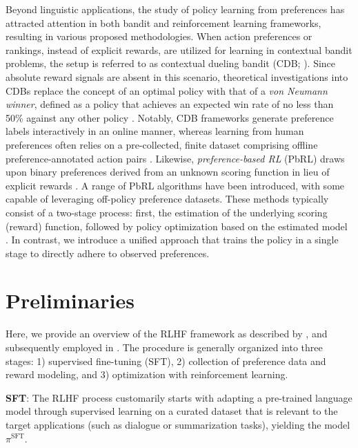 Beyond linguistic applications, the study of policy learning from preferences has attracted attention in both bandit and reinforcement learning frameworks, resulting in various proposed methodologies. When action preferences or rankings, instead of explicit rewards, are utilized for learning in contextual bandit problems, the setup is referred to as contextual dueling bandit (CDB; \cite{yue2012karmed,dudik2015contextual}). Since absolute reward signals are absent in this scenario, theoretical investigations into CDBs replace the concept of an optimal policy with that of a \textit{von Neumann winner}, defined as a policy that achieves an expected win rate of no less than 50\% against any other policy \citep{dudik2015contextual}. Notably, CDB frameworks generate preference labels interactively in an online manner, whereas learning from human preferences often relies on a pre-collected, finite dataset comprising offline preference-annotated action pairs \citep{yan2022human}. Likewise, \textit{preference-based RL} (PbRL) draws upon binary preferences derived from an unknown scoring function in lieu of explicit rewards \citep{BusaFekete2014,ruiz2023dueling}. A range of PbRL algorithms have been introduced, with some capable of leveraging off-policy preference datasets. These methods typically consist of a two-stage process: first, the estimation of the underlying scoring (reward) function, followed by policy optimization based on the estimated model \citep{jain2013learning,BusaFekete2014,christiano2017deep,sadigh2017active,kupcsik2018learning}. In contrast, we introduce a unified approach that trains the policy in a single stage to directly adhere to observed preferences.

\section{Preliminaries}\label{section:prelims}

Here, we provide an overview of the RLHF framework as described by \citeauthor{ziegler2020finetuning}, and subsequently employed in \citep{stiennon2022learning, bai2022training, ouyang2022training}. The procedure is generally organized into three stages: 1) supervised fine-tuning (SFT), 2) collection of preference data and reward modeling, and 3) optimization with reinforcement learning.

\textbf{SFT}: The RLHF process customarily starts with adapting a pre-trained language model through supervised learning on a curated dataset that is relevant to the target applications (such as dialogue or summarization tasks), yielding the model $\pi^\text{SFT}$. 

